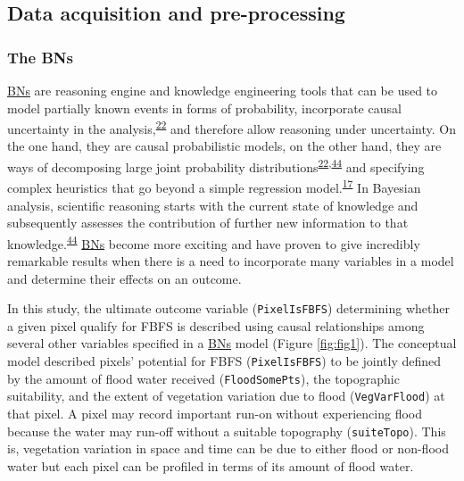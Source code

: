 \documentclass[12pt,oneside]{article}
\begin{document}
\hypertarget{I3}{%
\subsection{Data acquisition and pre-processing}\label{I3}}

\hypertarget{I31}{%
\subsubsection{The BNs}\label{I31}}

\href{https://en.wikipedia.org/wiki/Bayesian_network}{BNs} are reasoning engine and knowledge engineering tools that can be used to model partially known events in forms of probability, incorporate causal uncertainty in the analysis,\textsuperscript{\protect\hyperlink{ref-Pourret_et_al_2008}{22}} and therefore allow reasoning under uncertainty. On the one hand, they are causal probabilistic models, on the other hand, they are ways of decomposing large joint probability distributions\textsuperscript{\protect\hyperlink{ref-Pourret_et_al_2008}{22},\protect\hyperlink{ref-Pearl_2000}{44}} and specifying complex heuristics that go beyond a simple regression model.\textsuperscript{\protect\hyperlink{ref-Whitney_et_al_2018}{17}} In Bayesian analysis, scientific reasoning starts with the current state of knowledge and subsequently assesses the contribution of further new information to that knowledge.\textsuperscript{\protect\hyperlink{ref-Pearl_2000}{44}} \href{https://en.wikipedia.org/wiki/Bayesian_network}{BNs} become more exciting and have proven to give incredibly remarkable results when there is a need to incorporate many variables in a model and determine their effects on an outcome.

In this study, the ultimate outcome variable (\texttt{PixelIsFBFS}) determining whether a given pixel qualify for FBFS is described using causal relationships among several other variables specified in a \href{https://en.wikipedia.org/wiki/Bayesian_network}{BNs} model (Figure \ref{fig:fig1}). The conceptual model described pixels' potential for FBFS (\texttt{PixelIsFBFS}) to be jointly defined by the amount of flood water received (\texttt{FloodSomePts}), the topographic suitability, and the extent of vegetation variation due to flood (\texttt{VegVarFlood}) at that pixel. A pixel may record important run-on without experiencing flood because the water may run-off without a suitable topography (\texttt{suiteTopo}). This is, vegetation variation in space and time can be due to either flood or non-flood water but each pixel can be profiled in terms of its amount of flood water.
\end{document}

